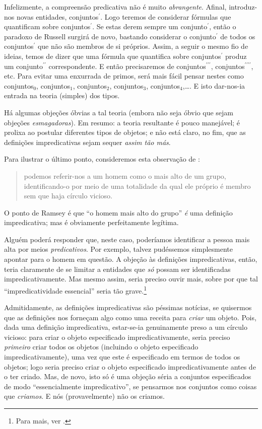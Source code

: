 \documentclass[../../../include/open-logic-section]{subfiles}
\begin{document}
Infelizmente, a compreensão predicativa não é muito
\emph{abrangente}. Afinal, introduz-nos novas entidades,
conjuntos$^\prime$. Logo teremos de considerar fórmulas que quantificam
sobre conjuntos$^\prime$. Se estas derem sempre um conjunto$^\prime$, então
o paradoxo de Russell surgirá de novo, bastando considerar o
conjunto$^\prime$ de todos os conjuntos$^\prime$ que não são membros de si próprios. Assim, a seguir o
mesmo fio de ideias, temos de dizer que uma fórmula que quantifica sobre
conjuntos$^\prime$ produz um conjunto$^{\prime\prime}$ correspondente. E então
precisaremos de conjuntos$^{\prime\prime\prime}$,
conjuntos$^{\prime\prime\prime\prime}$, etc. Para evitar uma enxurrada de primos,
será mais fácil pensar nestes como conjuntos$_0$, conjuntos$_1$, conjuntos$_2$,
conjuntos$_3$, conjuntos$_4$,\ldots. E isto dar-nos-ia entrada na
teoria (simples) dos tipos. 

Há algumas objeções óbvias a tal teoria (embora não seja
óbvio que sejam objeções \emph{esmagadoras}). Em resumo:
a teoria resultante é pouco manejável; é prolixa ao
postular diferentes tipos de objetos; e não está claro, no
fim, que as definições impredicativas sejam sequer \emph{assim tão más}. 
	
Para ilustrar o último ponto, consideremos esta observação de
\citeauthor{Ramsey1925}:
\begin{quote}
	podemos referir-nos a um homem como o mais alto de um grupo, identificando-o
	por meio de uma totalidade da qual ele próprio é membro sem
	que haja círculo vicioso. \citep{Ramsey1925}
\end{quote}
O ponto de Ramsey é que ``o homem mais alto do grupo'' \emph{é} uma
definição impredicativa; mas é obviamente perfeitamente legítima. 

Alguém poderá responder que, neste caso, poderíamos identificar a pessoa mais alta por meios \emph{predicativos}. Por exemplo, talvez pudéssemos simplesmente
apontar para o homem em questão. A objeção às definições impredicativas,
então, teria claramente de se limitar a entidades que
\emph{só} possam ser identificadas impredicativamente. Mas mesmo assim, seria preciso ouvir mais, sobre por que tal ``impredicatividade essencial'' seria
tão grave.\footnote{Para mais, ver \citet{Linnebo2010}.}

Admitidamente, as definições impredicativas são péssimas notícias, se
quisermos que as definições nos forneçam algo como uma receita para
\emph{criar} um objeto. Pois, dada uma definição impredicativa, estar-se-ia
genuinamente preso a um círculo vicioso: para criar o
objeto especificado impredicativamente, seria preciso \emph{primeiro}
criar todos os objetos (incluindo o objeto especificado impredicativamente), uma vez que este é especificado em
termos de todos os objetos; logo seria preciso criar o
objeto especificado impredicativamente antes de o ter criado. Mas,
de novo, isto só é uma objeção séria a conjuntos especificados de modo ``essencialmente
impredicativo'', se pensarmos nos conjuntos como coisas que
\emph{criamos}. E nós (provavelmente) não os criamos.
\end{document}
